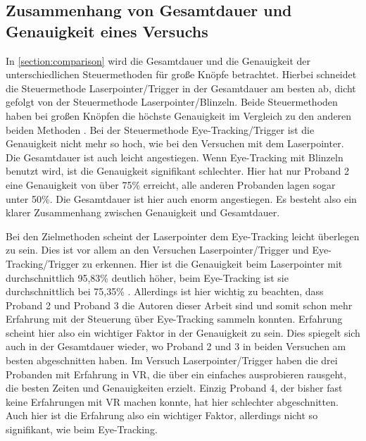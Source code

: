 \subsection{Zusammenhang von Gesamtdauer und Genauigkeit eines Versuchs}
In \autoref{section:comparison} wird die Gesamtdauer und die Genauigkeit der unterschiedlichen Steuermethoden für große Knöpfe betrachtet. Hierbei schneidet die Steuermethode Laserpointer/Trigger in der Gesamtdauer am besten ab, dicht gefolgt von der Steuermethode Laserpointer/Blinzeln. Beide Steuermethoden haben bei großen Knöpfen die höchste Genauigkeit im Vergleich zu den anderen beiden Methoden . Bei der Steuermethode Eye-Tracking/Trigger ist die Genauigkeit nicht mehr so hoch, wie bei den Versuchen mit dem Laserpointer. Die Gesamtdauer ist auch  leicht angestiegen. Wenn Eye-Tracking mit Blinzeln benutzt wird, ist die Genauigkeit signifikant schlechter. Hier hat nur Proband 2 eine Genauigkeit von über 75\% erreicht, alle anderen Probanden lagen sogar unter 50\%. Die Gesamtdauer ist hier auch enorm angestiegen. Es besteht also ein klarer Zusammenhang zwischen Genauigkeit und Gesamtdauer. 

Bei den Zielmethoden scheint der Laserpointer dem Eye-Tracking leicht überlegen zu sein. Dies ist vor allem an den Versuchen Laserpointer/Trigger und Eye-Tracking/Trigger zu erkennen. Hier ist die Genauigkeit beim Laserpointer mit durchschnittlich 95,83\% deutlich höher, beim Eye-Tracking ist sie durchschnittlich bei 75,35\% . Allerdings ist hier wichtig zu beachten, dass Proband 2 und Proband 3 die Autoren dieser Arbeit sind und somit schon mehr Erfahrung mit der Steuerung über Eye-Tracking sammeln konnten. Erfahrung scheint hier also ein wichtiger Faktor in der Genauigkeit zu sein. Dies spiegelt sich auch in der Gesamtdauer wieder, wo Proband 2 und 3 in beiden Versuchen am besten abgeschnitten haben. Im Versuch Laserpointer/Trigger haben die drei Probanden mit Erfahrung in VR, die über ein einfaches ausprobieren rausgeht, die besten Zeiten und Genauigkeiten erzielt. Einzig Proband 4, der bisher fast keine Erfahrungen mit VR machen konnte, hat hier schlechter abgeschnitten. Auch hier ist die Erfahrung also ein wichtiger Faktor, allerdings nicht so signifikant, wie beim Eye-Tracking. 

